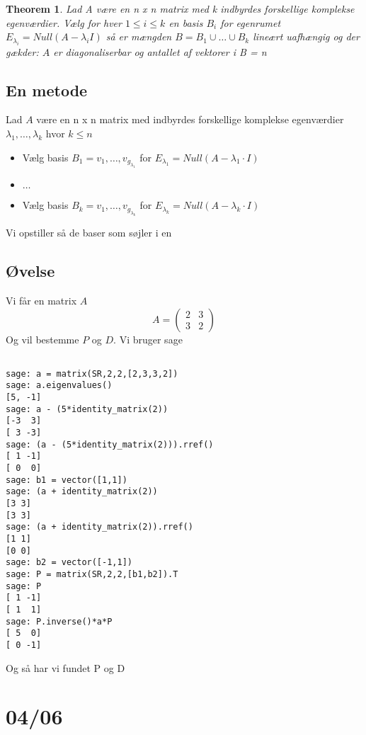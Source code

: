 \documentclass[a4paper,fleqn]{report}
\newtheorem{theorem}{Theorem}[chapter]
\begin{document}
	\begin{theorem}{6.4}
		Lad A være en n x n matrix med k indbyrdes forskellige komplekse egenværdier.
		Vælg for hver $1 \leq i \leq k$ en basis $B_i$ for egenrumet $E_{\lambda_i} = 
		Null(A - \lambda_iI)$ så er mængden $B = B_1 \cup \dots \cup B_k$ lineært uafhængig
		og der gækder: $A$ er diagonaliserbar og antallet af vektorer i B = n
	\end{theorem}

	\section{En metode}
	Lad $A$ være en n x n matrix med indbyrdes forskellige komplekse egenværdier $\lambda_1,
	\dots, \lambda_k$ hvor $k \leq n$\\
	\begin{itemize}
		\item Vælg basis $B_1 = v_1, \dots, v_{g_{\lambda_1}}$ for $E_{\lambda_1} = Null(A-\lambda_{1} \cdot I) $
		\item $\dots$
		\item Vælg basis $B_k = v_1, \dots, v_{g_{\lambda_k}}$ for $E_{\lambda_k} = Null(A-\lambda_k \cdot I)$
	\end{itemize}
	Vi opstiller så de baser som søjler i en
	

	\section{Øvelse}
	Vi får en matrix $A$
	\[ A = \begin{pmatrix}2 & 3\\3 & 2\end{pmatrix} \]
	Og vil bestemme $P$ og $D$. Vi bruger sage
	\begin{verbatim}

sage: a = matrix(SR,2,2,[2,3,3,2])
sage: a.eigenvalues()
[5, -1]
sage: a - (5*identity_matrix(2))
[-3  3]
[ 3 -3]
sage: (a - (5*identity_matrix(2))).rref()
[ 1 -1]
[ 0  0]
sage: b1 = vector([1,1])
sage: (a + identity_matrix(2))
[3 3]
[3 3]
sage: (a + identity_matrix(2)).rref()
[1 1]
[0 0]
sage: b2 = vector([-1,1])
sage: P = matrix(SR,2,2,[b1,b2]).T
sage: P
[ 1 -1]
[ 1  1]
sage: P.inverse()*a*P
[ 5  0]
[ 0 -1]

\end{verbatim}
	Og så har vi fundet P og D
	\chapter{04/06}
\end{document}
